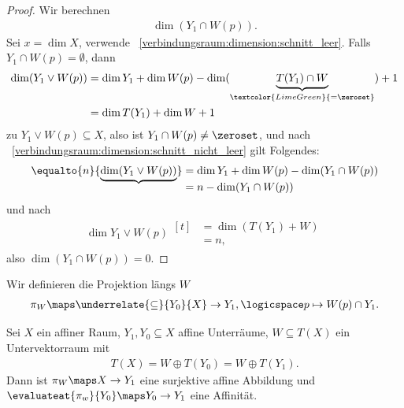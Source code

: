 \begin{proof}
    Wir berechnen
    \begin{align*}
        \dim(Y_1\cap W(p)).
    \end{align*}
    Sei \( x=\dim X \), verwende ~\ref{verbindungsraum:dimension:schnitt_leer}.
    Falls \( Y_1\cap W(p)=\emptyset \), dann
    \begin{align*}
        \dim(Y_1\vee W(p))\begin{aligned}[t] 
            &=\dim Y_1+\dim W(p)-\dim(\underbrace{T(Y_1)\cap W}_{\textcolor{LimeGreen}{=\zeroset}})+1\\
            &=\dim T(Y_1)+\dim W+1
        \end{aligned}
    \end{align*}
    \contra zu \( Y_1\vee W(p)\subseteq X \), also ist \( Y_1\cap W(p)\neq \zeroset \), und nach ~\ref{verbindungsraum:dimension:schnitt_nicht_leer} gilt Folgendes:
    \begin{align*}
        \equalto{n}{\underbrace{\dim (Y_1\vee W(p))}}\begin{aligned}[t] 
            &=\dim Y_1+\dim W(p)-\dim(Y_1\cap W(p))\\
            &=n-\dim(Y_1\cap W(p))
        \end{aligned}
    \end{align*}
    und nach 
    \begin{align*}
        \dim Y_1\vee W(p)\begin{aligned}[t] 
            &=\dim(T(Y_1)+W)\\
            &=n,
        \end{aligned}
    \end{align*}
    also \( \dim(Y_1\cap W(p))=0 \).
    
\end{proof}
Wir definieren die Projektion längs \( W \)
\begin{align*}
    \pi_W\maps \underrelate{\subseteq}{Y_0}{X}\to Y_1,\logicspace p\mapsto W(p)\cap Y_1.
\end{align*}
\begin{satz}
    Sei \( X \) ein affiner Raum, \( Y_1,Y_0\subseteq X \) affine Unterräume, \( W\subseteq T(X) \) ein Untervektorraum mit 
    \begin{align*}
        T(X)=W\oplus T(Y_0)=W\oplus T(Y_1).
    \end{align*}
    Dann ist \( \pi_W\maps X\to Y_1 \) eine surjektive affine Abbildung und \( \evaluateat{\pi_w}{Y_0}\maps Y_0\to Y_1 \) eine Affinität.
\end{satz}

